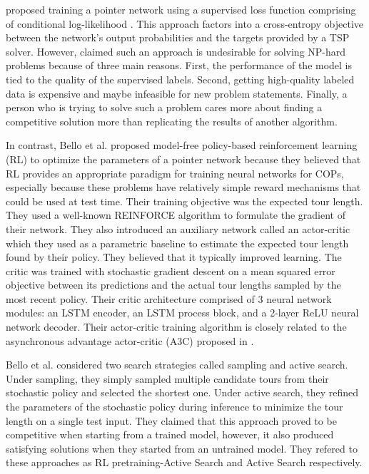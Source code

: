 \documentclass{article}
\begin{document}
\cite{vinyals2015pointer} proposed training a pointer network using a supervised loss function comprising of conditional log-likelihood \cite{vinyals2015pointer}. This approach factors into a cross-entropy objective between the network's output probabilities and the targets provided by a TSP solver. However, \cite{bello2016neural} claimed such an approach is undesirable for solving NP-hard problems because of three main reasons. First, the performance of the model is tied to the quality of the supervised labels. Second, getting high-quality labeled data is expensive and maybe infeasible for new problem statements. Finally, a person who is trying to solve such a problem cares more about finding a competitive solution more than replicating the results of another algorithm.

In contrast, Bello et al. proposed model-free policy-based reinforcement learning (RL) to optimize the parameters of a pointer network because they believed that RL provides an appropriate paradigm for training neural networks for COPs, especially because these problems have relatively simple reward mechanisms that could be used at test time. Their training objective was the expected tour length. They used a well-known REINFORCE algorithm \cite{williams1992simple} to formulate the gradient of their network. They also introduced an auxiliary network called an actor-critic \cite{joel2002actor} which they used as a parametric baseline to estimate the expected tour length found by their policy. They believed that it typically improved learning. The critic was trained with stochastic gradient descent on a mean squared error objective between its predictions and the actual tour lengths sampled by the most recent policy. Their critic architecture comprised of 3 neural network modules: an LSTM encoder, an LSTM process block, and a 2-layer ReLU neural network decoder. Their actor-critic training algorithm is closely related to the asynchronous advantage actor-critic (A3C) proposed in \cite{mnih2016asynchronous}.

Bello et al. considered two search strategies called sampling and active search. Under sampling, they simply sampled multiple candidate tours from their stochastic policy and selected the shortest one. Under active search, they refined the parameters of the stochastic policy during inference to minimize the tour length on a single test input. They claimed that this approach proved to be competitive when starting from a trained model, however, it also produced satisfying solutions when they started from an untrained model. They refered to these approaches as RL pretraining-Active Search and Active Search respectively. 
\end{document}

